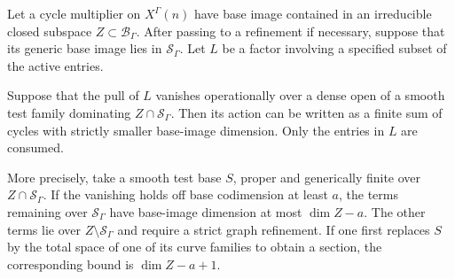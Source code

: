 \begin{lemma}
\label{lem:support-advancement}
Let a cycle multiplier on \(X^\Gamma(n)\) have base image contained in an
irreducible closed subspace \(Z\subset\mathcal B_\Gamma\).  After passing
to a refinement if necessary, suppose that its generic base image lies
in \(\mathcal S_\Gamma\).  Let \(L\) be a factor involving a specified
subset of the active entries.

Suppose that the pull of \(L\) vanishes operationally over a dense open
of a smooth test family dominating \(Z\cap\mathcal S_\Gamma\).  Then its
action can be written as a finite sum of cycles with strictly smaller
base-image dimension.  Only the entries in \(L\) are consumed.

More precisely, take a smooth test base \(S\), proper and generically
finite over \(Z\cap\mathcal S_\Gamma\).  If the vanishing holds off base
codimension at least \(a\), the terms remaining over \(\mathcal S_\Gamma\)
have base-image dimension at most \(\dim Z-a\).  The other terms lie over
\(Z\setminus\mathcal S_\Gamma\) and require a strict graph refinement.
If one first replaces \(S\) by the total space of one of its curve
families to obtain a section, the corresponding bound is
\(\dim Z-a+1\).
\end{lemma}

